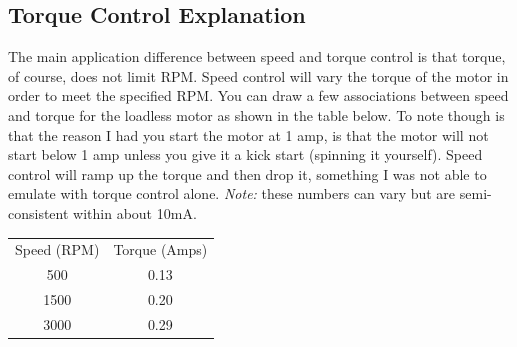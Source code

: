 \documentclass[10pt]{article}
\begin{document}
        \FloatBarrier \subsection{Torque Control Explanation}
            The main application difference between speed and torque control is that torque, of course, does not limit RPM. Speed control will vary the torque of the motor in order to meet the specified RPM. You can draw a few associations between speed and torque for the loadless motor as shown in the table below. To note though is that the reason I had you start the motor at 1 amp, is that the motor will not start below 1 amp unless you give it a kick start (spinning it yourself).  Speed control will ramp up the torque and then drop it, something I was not able to emulate with torque control alone. \emph{Note:} these numbers can vary but are  semi-consistent within about 10mA.
            \begin{center}
                \begin{tabular}{ c c }
                    Speed (RPM) & Torque (Amps) \\ 
                     500 & 0.13 \\  
                     1500 & 0.20 \\
                     3000 & 0.29
                \end{tabular}
            \end{center}
        
\end{document}
